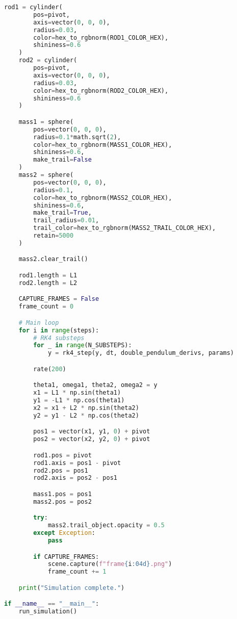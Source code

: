 \documentclass[letterpaper,12pt]{article}
\begin{document}
\begin{enumerate}[leftmargin=*, itemsep=1em]
\begin{lstlisting}[language=Python, caption=Double Pendulum Simulation (double\_pendulum.py), label=lst:doublependulum]
    rod1 = cylinder(
        pos=pivot,
        axis=vector(0, 0, 0),
        radius=0.03,
        color=hex_to_rgbnorm(ROD1_COLOR_HEX),
        shininess=0.6
    )
    rod2 = cylinder(
        pos=pivot,
        axis=vector(0, 0, 0),
        radius=0.03,
        color=hex_to_rgbnorm(ROD2_COLOR_HEX),
        shininess=0.6
    )

    mass1 = sphere(
        pos=vector(0, 0, 0),
        radius=0.1*math.sqrt(2),
        color=hex_to_rgbnorm(MASS1_COLOR_HEX),
        shininess=0.6,
        make_trail=False
    )
    mass2 = sphere(
        pos=vector(0, 0, 0),
        radius=0.1,
        color=hex_to_rgbnorm(MASS2_COLOR_HEX),
        shininess=0.6,
        make_trail=True,
        trail_radius=0.01,
        trail_color=hex_to_rgbnorm(MASS2_TRAIL_COLOR_HEX),
        retain=5000
    )

    mass2.clear_trail()

    rod1.length = L1
    rod2.length = L2

    CAPTURE_FRAMES = False
    frame_count = 0

    # Main loop
    for i in range(steps):
        # RK4 substeps
        for _ in range(N_SUBSTEPS):
            y = rk4_step(y, dt, double_pendulum_derivs, params)

        rate(200)

        theta1, omega1, theta2, omega2 = y
        x1 = L1 * np.sin(theta1)
        y1 = -L1 * np.cos(theta1)
        x2 = x1 + L2 * np.sin(theta2)
        y2 = y1 - L2 * np.cos(theta2)

        pos1 = vector(x1, y1, 0) + pivot
        pos2 = vector(x2, y2, 0) + pivot

        rod1.pos = pivot
        rod1.axis = pos1 - pivot
        rod2.pos = pos1
        rod2.axis = pos2 - pos1

        mass1.pos = pos1
        mass2.pos = pos2

        try:
            mass2.trail_object.opacity = 0.5
        except Exception:
            pass

        if CAPTURE_FRAMES:
            scene.capture(f"frame{i:04d}.png")
            frame_count += 1

    print("Simulation complete.")

if __name__ == "__main__":
    run_simulation()
\end{lstlisting}


\end{enumerate}
\end{document}
